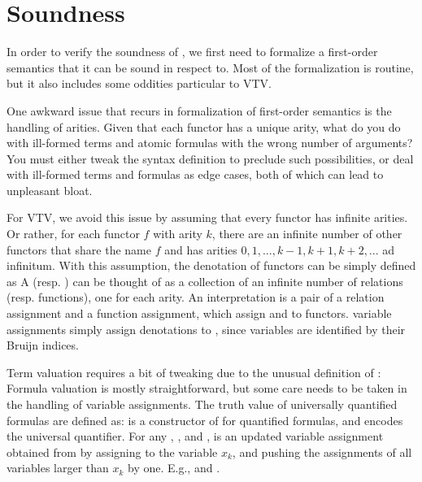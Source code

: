 \documentclass[12pt]{article}
\begin{document}
\section{Soundness} \label{sec:soundness}

In order to verify the soundness of , we first need to formalize 
a first-order semantics that it can be sound in respect to. Most of the formalization 
is routine, but it also includes some oddities particular to VTV.

One awkward issue that recurs in formalization of first-order semantics is the 
handling of arities. Given that each functor has a unique arity,
what do you do with ill-formed terms and atomic formulas with the wrong 
number of arguments? You must either tweak the syntax definition to 
preclude such possibilities, or deal with ill-formed terms and formulas as 
edge cases, both of which can lead to unpleasant bloat. 

For VTV, we avoid this issue by assuming that every functor has infinite arities.
Or rather, for each functor $f$ with arity $k$, there are an infinite number 
of other functors that share the name $f$ and has arities $0, 1, ..., k-1, k+1, k+2, ...$ 
ad infinitum. With this assumption, the denotation of functors can be 
simply defined as 
A  (resp. ) can be thought of as a 
collection of an infinite number of relations (resp. functions), one for 
each arity. An interpretation is a pair of a relation assignment and a 
function assignment, which assign  and  
to functors.
variable assignments simply assign denotations to , since variables are 
identified by their Bruijn indices.

Term valuation requires a bit of tweaking due to the unusual definition of :
Formula valuation is mostly straightforward, but some care needs to be taken 
in the handling of variable assignments. The truth value of universally quantified 
formulas are defined as:
 \AgdaSymbol{:}      
is a constructor of  for quantified formulas, and  
encodes the universal quantifier.
For any , , and , 
\AgdaSymbol{(} \AgdaFunction{/}   \AgdaSymbol{)} 
is an updated variable assignment obtained from  by assigning 
 to the variable $x_k$, and pushing the assignments of all variables 
larger than $x_k$ by one.
E.g., \AgdaSymbol{(} 
\AgdaFunction{/}   \AgdaSymbol{)}
 \AgdaSymbol{=}  
and 
\AgdaSymbol{(} 
\AgdaFunction{/}   \AgdaSymbol{)} 
\AgdaSymbol{(} \AgdaSymbol{)} \AgdaSymbol{=}  .
\end{document}
